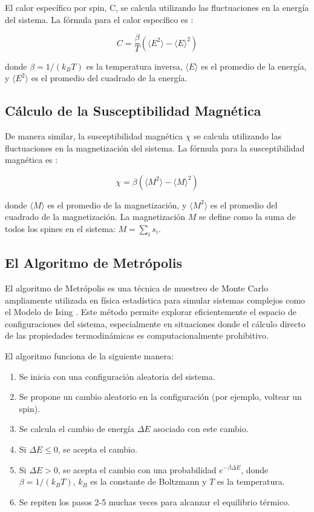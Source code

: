 \documentclass[twocolumn]{article}
\begin{document}
El calor específico por spin, C, se calcula utilizando las fluctuaciones en la energía del sistema. La fórmula para el calor específico es \cite{chang_fisica_computacional}:

\begin{equation}
    C = \frac{\beta}{T} (\langle E^2 \rangle - \langle E \rangle^2)
\end{equation}

donde $\beta = 1/(k_B T)$ es la temperatura inversa, $\langle E \rangle$ es el promedio de la energía, y $\langle E^2 \rangle$ es el promedio del cuadrado de la energía. 

\subsection*{Cálculo de la Susceptibilidad Magnética}

De manera similar, la susceptibilidad magnética $\chi$ se calcula utilizando las fluctuaciones en la magnetización del sistema. La fórmula para la susceptibilidad magnética es \cite{chang_fisica_computacional}:

\begin{equation}
    \chi = \beta (\langle M^2 \rangle - \langle M \rangle^2)
\end{equation}

donde $\langle M \rangle$ es el promedio de la magnetización, y $\langle M^2 \rangle$ es el promedio del cuadrado de la magnetización. La magnetización $M$ se define como la suma de todos los spines en el sistema: $M = \sum_i s_i$.

\subsection*{El Algoritmo de Metrópolis}

El algoritmo de Metrópolis es una técnica de muestreo de Monte Carlo ampliamente utilizada en física estadística para simular sistemas complejos como el Modelo de Ising \cite{algorithmarchive}. Este método permite explorar eficientemente el espacio de configuraciones del sistema, especialmente en situaciones donde el cálculo directo de las propiedades termodinámicas es computacionalmente prohibitivo.

El algoritmo funciona de la siguiente manera:

\begin{enumerate}
    \item Se inicia con una configuración aleatoria del sistema.
    \item Se propone un cambio aleatorio en la configuración (por ejemplo, voltear un spin).
    \item Se calcula el cambio de energía $\Delta E$ asociado con este cambio.
    \item Si $\Delta E \leq 0$, se acepta el cambio.
    \item Si $\Delta E > 0$, se acepta el cambio con una probabilidad $e^{-\beta \Delta E}$, donde $\beta = 1/(k_B T)$, $k_B$ es la constante de Boltzmann y $T$ es la temperatura.
    \item Se repiten los pasos 2-5 muchas veces para alcanzar el equilibrio térmico.
\end{enumerate}
\end{document}
